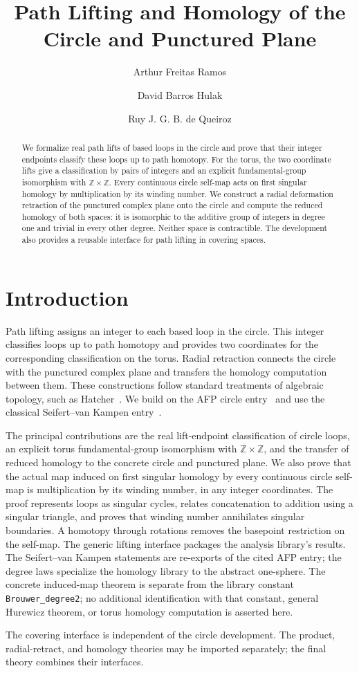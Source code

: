 \documentclass[11pt,a4paper]{article}
\begin{document}
\title{Path Lifting and Homology of the Circle and Punctured Plane}
\author{Arthur Freitas Ramos \and David Barros Hulak \and Ruy J. G. B. de Queiroz}
\maketitle
\begin{abstract}
  We formalize real path lifts of based loops in the circle and prove that
  their integer endpoints classify these loops up to path homotopy.  For
  the torus, the two coordinate lifts give a classification by pairs of
  integers and an explicit fundamental-group isomorphism with
  $\mathbb{Z}\times\mathbb{Z}$. Every continuous circle self-map acts on
  first singular homology by multiplication by its winding number.
  We construct a radial deformation retraction of the
  punctured complex plane onto the circle and compute the reduced homology
  of both spaces: it is isomorphic to the additive group of integers in
  degree one and trivial in every other degree.  Neither space is
  contractible.  The development also provides a reusable interface for
  path lifting in covering spaces.
\end{abstract}
\tableofcontents
\section{Introduction}
Path lifting assigns an integer to each based loop in the circle.  This
integer classifies loops up to path homotopy and provides two coordinates
for the corresponding classification on the torus.  Radial retraction
connects the circle with the punctured complex plane and transfers the
homology computation between them.  These constructions follow standard
treatments of algebraic topology, such as Hatcher~\cite{Hatcher2002}.
We build on the AFP circle
entry~\cite{FundamentalGroupCircleAFP} and use the classical
Seifert--van Kampen entry~\cite{SeifertVanKampenAFP}.

The principal contributions are the real lift-endpoint classification of
circle loops, an explicit torus fundamental-group isomorphism with
$\mathbb{Z}\times\mathbb{Z}$, and the transfer of reduced homology to the
concrete circle and punctured plane. We also prove that the actual map
induced on first singular homology by every continuous circle self-map
is multiplication by its winding number, in any integer coordinates.
The proof represents loops as singular cycles, relates concatenation to
addition using a singular triangle, and proves that winding number
annihilates singular boundaries. A homotopy through rotations removes
the basepoint restriction on the self-map.
The generic lifting interface packages the analysis library's results.
The Seifert--van Kampen statements are re-exports of the cited AFP entry;
the degree laws specialize the homology library to the abstract one-sphere.
The concrete induced-map theorem is separate from the library constant
\texttt{Brouwer\_degree2}; no additional identification with that constant,
general Hurewicz theorem, or torus homology computation is asserted here.

The covering interface is independent of the circle development.  The
product, radial-retract, and homology theories may be imported separately;
the final theory combines their interfaces.



\end{document}
